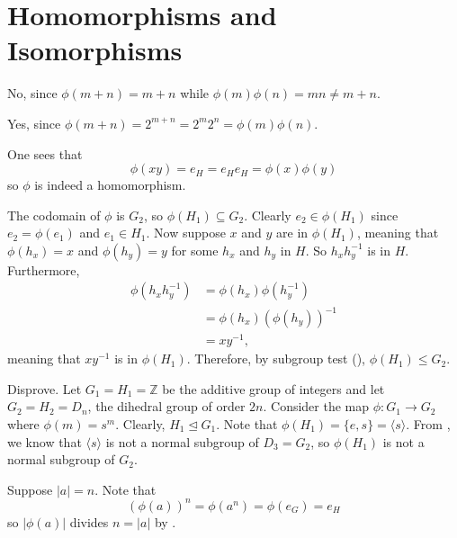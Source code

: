 \section{Homomorphisms and Isomorphisms}
\begin{questions}
    \item \begin{partquestions}{\alph*}
        \item No, since $\phi(m+n) = m + n$ while $\phi(m)\phi(n) = mn \neq m+n$.
        \item Yes, since $\phi(m+n) = 2^{m+n} = 2^m2^n = \phi(m)\phi(n)$.
    \end{partquestions}

    \item One sees that
    \[
        \phi(xy) = e_H = e_He_H = \phi(x)\phi(y)
    \]
    so $\phi$ is indeed a homomorphism.

    \item The codomain of $\phi$ is $G_2$, so $\phi(H_1) \subseteq G_2$. Clearly $e_2 \in \phi(H_1)$ since $e_2 = \phi(e_1)$ and $e_1 \in H_1$. Now suppose $x$ and $y$ are in $\phi(H_1)$, meaning that $\phi(h_x) = x$ and $\phi(h_y) = y$ for some $h_x$ and $h_y$ in $H$. So $h_xh_y^{-1}$ is in $H$. Furthermore,
    \begin{align*}
        \phi(h_xh_y^{-1}) &= \phi(h_x)\phi(h_y^{-1})\\
        &= \phi(h_x)\left(\phi(h_y)\right)^{-1}\\
        &= xy^{-1},
    \end{align*}
    meaning that $xy^{-1}$ is in $\phi(H_1)$. Therefore, by subgroup test (), $\phi(H_1) \leq G_2$.

    \item Disprove. Let $G_1 = H_1 = \mathbb{Z}$ be the additive group of integers and let $G_2 = H_2 = D_n$, the dihedral group of order $2n$. Consider the map $\phi: G_1 \to G_2$ where $\phi(m) = s^m$. Clearly, $H_1 \unlhd G_1$. Note that $\phi(H_1) = \{e, s\} = \langle s \rangle$. From , we know that $\langle s \rangle$ is not a normal subgroup of $D_3 = G_2$, so $\phi(H_1)$ is not a normal subgroup of $G_2$.

    \item Suppose $|a| = n$. Note that
    \[
        \left(\phi(a)\right)^n = \phi\left(a^n\right) = \phi(e_G) = e_H
    \]
    so $|\phi(a)|$ divides $n = |a|$ by .


\end{questions}
